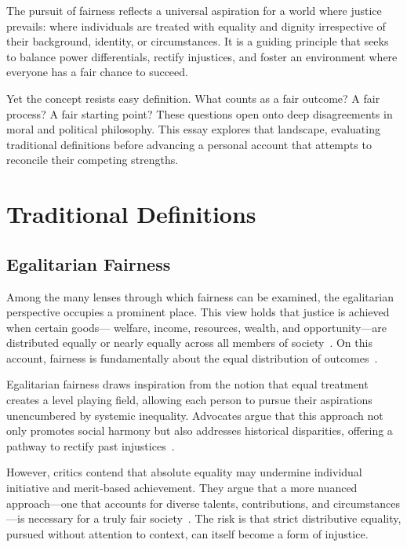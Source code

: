 \documentclass[11pt]{../shared/essay/essay}
\begin{document}
The pursuit of fairness reflects a universal aspiration for a world where justice prevails:
where individuals are treated with equality and dignity irrespective of their background,
identity, or circumstances. It is a guiding principle that seeks to balance power differentials,
rectify injustices, and foster an environment where everyone has a fair chance to succeed.

Yet the concept resists easy definition. What counts as a fair outcome? A fair process? A fair
starting point? These questions open onto deep disagreements in moral and political philosophy.
This essay explores that landscape, evaluating traditional definitions before advancing a
personal account that attempts to reconcile their competing strengths.

\section{Traditional Definitions}

\subsection{Egalitarian Fairness}

Among the many lenses through which fairness can be examined, the egalitarian perspective
occupies a prominent place. This view holds that justice is achieved when certain goods---
welfare, income, resources, wealth, and opportunity---are distributed equally or nearly equally
across all members of society~\cite{temkin2019,afolayan2015}. On this account, fairness is
fundamentally about the equal distribution of outcomes~\cite{eldridge2023,johnson2023}.

Egalitarian fairness draws inspiration from the notion that equal treatment creates a level
playing field, allowing each person to pursue their aspirations unencumbered by systemic
inequality. Advocates argue that this approach not only promotes social harmony but also
addresses historical disparities, offering a pathway to rectify past injustices~\cite{baiasu2020}.

However, critics contend that absolute equality may undermine individual initiative and
merit-based achievement. They argue that a more nuanced approach---one that accounts for
diverse talents, contributions, and circumstances---is necessary for a truly fair
society~\cite{temkin2019}. The risk is that strict distributive equality, pursued without
attention to context, can itself become a form of injustice.
\end{document}
